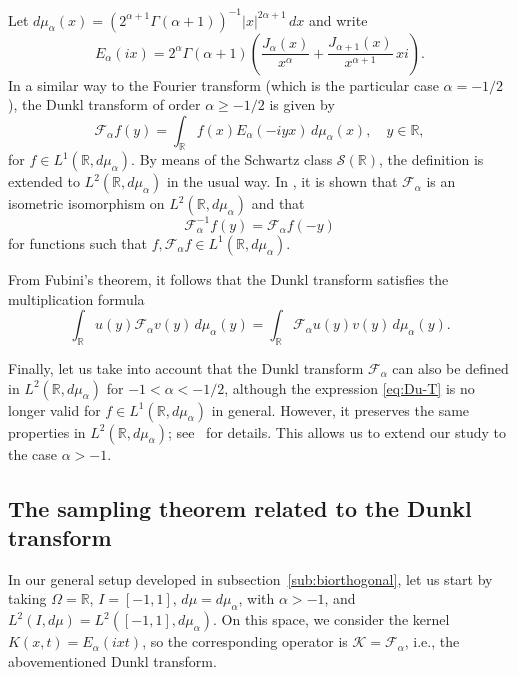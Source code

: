 \documentclass[11pt,a4paper]{amsart}
\theoremstyle{plain}
\theoremstyle{definition}
\newcommand{\R}{\mathbb{R}}
\newcommand{\calK}{\mathcal{K}}
\newcommand{\calS}{\mathcal{S}}
\newcommand{\calF}{\mathcal{F}}
\begin{document}
Let $d\mu_{\alpha}(x) = (2^{\alpha+1} \Gamma(\alpha+1))^{-1}|x|^{2\alpha+1}\,dx$
and write
\begin{equation}
\label{eq:Ea}
  E_{\alpha}(ix) = 2^{\alpha}\Gamma(\alpha+1)
  \left( \frac{J_{\alpha}(x)}{x^{\alpha}} + \frac{J_{\alpha+1}(x)}{x^{\alpha+1}}\,xi\right).
\end{equation}
In a similar way to the Fourier transform (which is the particular
case $\alpha = -1/2$), the Dunkl transform of order $\alpha \geq -1/2$ is
given by
\begin{equation}
\label{eq:Du-T}
  \calF_{\alpha}f(y) = \int_{\R} f(x)E_{\alpha}(-iyx)
  \,d\mu_{\alpha}(x),\quad y\in \R,
\end{equation}
for $f\in L^{1}(\R,d\mu_{\alpha})$. By means of the Schwartz class
$\calS(\R)$, the definition is extended to
$L^{2}(\R,d\mu_{\alpha})$ in the usual way. In \cite{Jeu},
it is shown that $\calF_{\alpha}$ is an isometric isomorphism on
$L^{2}(\R,d\mu_{\alpha})$ and that
\begin{equation*}
  \calF_{\alpha}^{-1}f(y) = \calF_{\alpha}f(-y)
\end{equation*}
for functions such that
$f,\calF_{\alpha}f\in L^{1}(\R,d\mu_{\alpha})$.

From Fubini's theorem, it follows that the Dunkl transform satisfies the multiplication formula
\begin{equation}
\label{eq:mulFa}
  \int_{\R}u(y) \calF_\alpha v(y)\,d\mu_\alpha(y) 
  = \int_{\R} \calF_\alpha u(y) v(y)\,d\mu_\alpha (y).
\end{equation}

Finally, let us take into account that the Dunkl transform
$\calF_{\alpha}$ can also be defined in
$L^2(\R,d\mu_{\alpha})$ for $-1 < \alpha < -1/2$, although the
expression \eqref{eq:Du-T} is no longer valid for
$f\in L^1(\R,d\mu_{\alpha})$ in general.
However, it preserves the same properties in
$L^2(\R,d\mu_{\alpha})$; see~\cite{Rosenblum} for details. This
allows us to extend our study to the case $\alpha > -1$.


\subsection{The sampling theorem related to the Dunkl transform}
\label{sub:samp-Dunkl}

In our general setup developed in subsection~\ref{sub:biorthogonal}, let us start by taking
$\Omega = \R$, $I = [-1,1]$, $d\mu = d\mu_\alpha$, with $\alpha>-1$, and
$L^{2}(I,d\mu) = L^{2}([-1,1],d\mu_{\alpha})$.
On this space, we consider the kernel $K(x,t) = E_{\alpha}(ixt)$,
so the corresponding operator is $\calK = \calF_{\alpha}$,
i.e., the abovementioned Dunkl transform.
\end{document}
